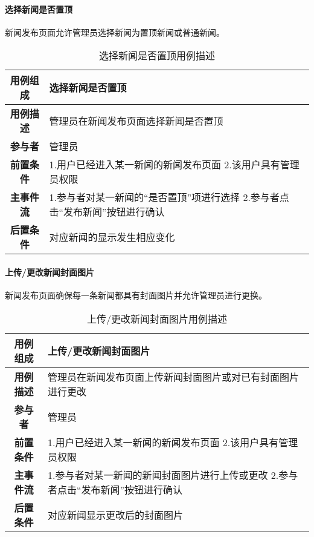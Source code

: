 \paragraph{选择新闻是否置顶}

新闻发布页面允许管理员选择新闻为置顶新闻或普通新闻。\\

\begin{table}[H]
	\centering
	\caption{选择新闻是否置顶用例描述}
	\renewcommand\arraystretch{1.5}
	\begin{tabular}{|c|>{\raggedright\arraybackslash}p{10cm}|}
		\hline
		\textbf{用例组成} & \textbf{选择新闻是否置顶}\\
		\hline
		\textbf{用例描述} & 管理员在新闻发布页面选择新闻是否置顶\\ 
		\hline
		\textbf{参与者} & 管理员\\
		\hline
		\textbf{前置条件} & 
		1.用户已经进入某一新闻的新闻发布页面\newline
		2.该用户具有管理员权限\\
		\hline
		\textbf{主事件流} & 
		1.参与者对某一新闻的“是否置顶”项进行选择\newline
		2.参与者点击“发布新闻”按钮进行确认\\
		\hline
		\textbf{后置条件} & 对应新闻的显示发生相应变化\\
		\hline
	\end{tabular}
\end{table}

\paragraph{上传/更改新闻封面图片}

新闻发布页面确保每一条新闻都具有封面图片并允许管理员进行更换。\\

\begin{table}[H]
	\centering
	\caption{上传/更改新闻封面图片用例描述}
	\renewcommand\arraystretch{1.5}
	\begin{tabular}{|c|>{\raggedright\arraybackslash}p{10cm}|}
		\hline
		\textbf{用例组成} & \textbf{上传/更改新闻封面图片}\\
		\hline
		\textbf{用例描述} & 管理员在新闻发布页面上传新闻封面图片或对已有封面图片进行更改\\ 
		\hline
		\textbf{参与者} & 管理员\\
		\hline
		\textbf{前置条件} & 
		1.用户已经进入某一新闻的新闻发布页面\newline
		2.该用户具有管理员权限\\
		\hline
		\textbf{主事件流} & 
		1.参与者对某一新闻的新闻封面图片进行上传或更改\newline
		2.参与者点击“发布新闻”按钮进行确认\\
		\hline
		\textbf{后置条件} & 对应新闻显示更改后的封面图片\\
		\hline
	\end{tabular}
\end{table}

